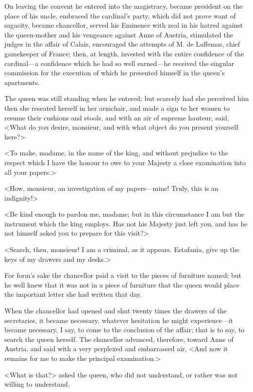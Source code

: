 On leaving the convent he entered into the magistracy, became president on the place of his uncle, embraced the cardinal's party, which did not prove want of sagacity, became chancellor, served his Eminence with zeal in his hatred against the queen-mother and his vengeance against Anne of Austria, stimulated the judges in the affair of Calais, encouraged the attempts of M. de Laffemas, chief gamekeeper of France; then, at length, invested with the entire confidence of the cardinal---a confidence which he had so well earned---he received the singular commission for the execution of which he presented himself in the queen's apartments. 

The queen was still standing when he entered; but scarcely had she perceived him then she reseated herself in her armchair, and made a sign to her women to resume their cushions and stools, and with an air of supreme hauteur, said, <What do you desire, monsieur, and with what object do you present yourself here?> 

<To make, madame, in the name of the king, and without prejudice to the respect which I have the honour to owe to your Majesty a close examination into all your papers.> 

<How, monsieur, an investigation of my papers---mine! Truly, this is an indignity!> 

<Be kind enough to pardon me, madame; but in this circumstance I am but the instrument which the king employs. Has not his Majesty just left you, and has he not himself asked you to prepare for this visit?> 

<Search, then, monsieur! I am a criminal, as it appears. Estafania, give up the keys of my drawers and my desks.> 

For form's sake the chancellor paid a visit to the pieces of furniture named; but he well knew that it was not in a piece of furniture that the queen would place the important letter she had written that day. 

When the chancellor had opened and shut twenty times the drawers of the secretaries, it became necessary, whatever hesitation he might experience---it became necessary, I say, to come to the conclusion of the affair; that is to say, to search the queen herself. The chancellor advanced, therefore, toward Anne of Austria, and said with a very perplexed and embarrassed air, <And now it remains for me to make the principal examination.> 

<What is that?> asked the queen, who did not understand, or rather was not willing to understand. 

